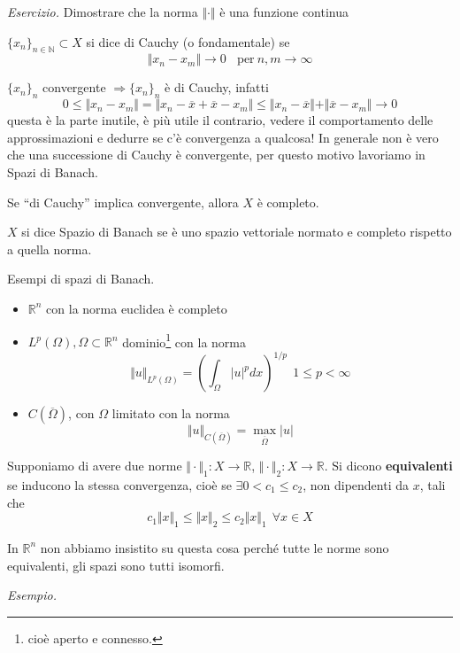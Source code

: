 \documentclass[10pt,a4paper,twoside,openright]{book}
\begin{document}
\textit{Esercizio.} Dimostrare che la norma $\Vert \cdotp \Vert $ è una funzione continua
\begin{definition}
	$\{x_{n}\}_{n\in \mathbb{N}} \subset X$ si dice di Cauchy (o fondamentale) se
	\begin{equation*}
		\Vert x_{n} -x_{m}\Vert \rightarrow 0\ \ \ \ \text{per} \ n,m\rightarrow \infty 
	\end{equation*}
\end{definition}
$\{x_{n}\}_{n}$ convergente $\Rightarrow \{x_{n}\}_{n}$ è di Cauchy, infatti
\begin{equation*}
	0\leqslant \Vert x_{n} -x_{m}\Vert =\Vert x_{n} -\overline{x} +\overline{x} -x_{m}\Vert \leqslant \Vert x_{n} -\overline{x}\Vert +\Vert \overline{x} -x_{m}\Vert \rightarrow 0
\end{equation*}
questa è la parte inutile, è più utile il contrario, vedere il comportamento delle approssimazioni e dedurre se c'è convergenza a qualcosa! In generale non è vero che una successione di Cauchy è convergente, per questo motivo lavoriamo in Spazi di Banach.
\begin{definition}
	Se ``di Cauchy'' implica convergente, allora $X$ è completo.
\end{definition}
\begin{definition}
	$X$ si dice Spazio di Banach se è uno spazio vettoriale normato e completo rispetto a quella norma.
\end{definition}
Esempi di spazi di Banach.
\begin{itemize}
	\item $\mathbb{R}^{n}$ con la norma euclidea è completo
	\item $L^{p}(\Omega),\Omega \subset \mathbb{R}^{n}$ dominio\footnote{cioè aperto e connesso.} con la norma\begin{equation*}
	      \Vert u\Vert _{L^{p}(\Omega)} =\left(\int _{\Omega }| u| ^{p} dx\right)^{1/p} \ \ 1\leqslant p< \infty 
	\end{equation*}
	\item $C(\overline{\Omega })$, con $\Omega $ limitato con la norma\begin{equation*}
	      \Vert u\Vert _{C(\overline{\Omega })} =\max_{\overline{\Omega }}| u| 
	\end{equation*}
\end{itemize}
\begin{definition}
	Supponiamo di avere due norme $\Vert \cdotp \Vert _{1} :X\rightarrow \mathbb{R}$, $\Vert \cdotp \Vert _{2} :X\rightarrow \mathbb{R}$. Si dicono \textbf{equivalenti} se inducono la stessa convergenza, cioè se $\exists 0< c_{1} \leqslant c_{2}$, non dipendenti da $x$, tali che
	\begin{equation*}
		c_{1}\Vert x\Vert _{1} \leqslant \Vert x\Vert _{2} \leqslant c_{2}\Vert x\Vert _{1} \ \ \forall x\in X
	\end{equation*}
\end{definition}
\begin{nb}
	In $\mathbb{R}^{n}$ non abbiamo insistito su questa cosa perché tutte le norme sono equivalenti, gli spazi sono tutti isomorfi.
\end{nb}
\textit{Esempio.}
\end{document}
